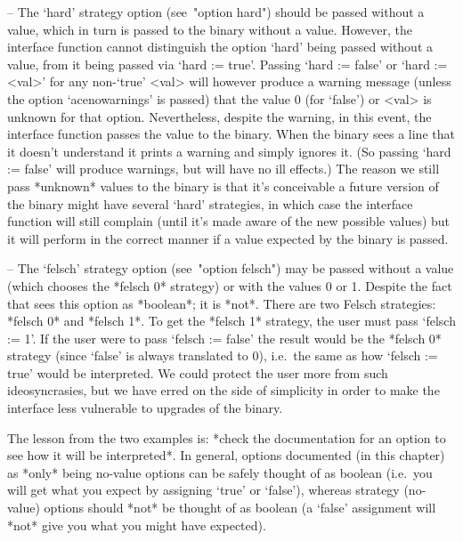 \beginlist

\item{--} The `hard' strategy option  (see~"option  hard")  should  be
passed without a value, which in turn is passed to the  {\ACE}  binary
without  a  value.  However,  the  {\ACE}  interface  function  cannot
distinguish the option `hard' being passed without a  value,  from  it
being passed via `hard := true'. Passing `hard := false' or  `hard  :=
<val>' for any non-`true' <val> will however produce a warning message
(unless the option `acenowarnings' is passed) that the  value  0  (for
`false') or <val> is unknown for that  option.  Nevertheless,  despite
the warning, in this event, the {\ACE} interface function  passes  the
value to the {\ACE} binary. When the {\ACE} binary sees a line that it
doesn't understand it prints a warning  and  simply  ignores  it.  (So
passing `hard := false' will produce warnings, but will  have  no  ill
effects.) The reason we still pass  *unknown*  values  to  the  {\ACE}
binary is that it's conceivable a future version of the {\ACE}  binary
might have  several  `hard'  strategies,  in  which  case  the  {\ACE}
interface function will still complain (until it's made aware  of  the
new possible values) but it will perform in the correct  manner  if  a
value expected by the {\ACE} binary is passed.

\item{--} The `felsch' strategy option (see~"option  felsch")  may  be
passed without a value (which chooses the *felsch 0* strategy) or with
the values 0 or 1. Despite the fact that {\GAP} sees  this  option  as
*boolean*; it is *not*. There are two Felsch  strategies:  *felsch  0*
and *felsch 1*. To get the *felsch 1* strategy,  the  user  must  pass
`felsch := 1'. If the user were to pass `felsch := false'  the  result
would be the *felsch 0* strategy (since `false' is  always  translated
to 0), i.e.~the same as how `felsch := true' would be interpreted.  We
could protect the user more from  such  ideosyncrasies,  but  we  have
erred on the side of simplicity in order to make  the  interface  less
vulnerable to upgrades of the {\ACE} binary.

\endlist

The lesson from the two examples is: *check the documentation  for  an
option to see  how  it  will  be  interpreted*.  In  general,  options
documented (in this chapter) as *only* being no-value options  can  be
safely thought of as boolean (i.e.~you will get  what  you  expect  by
assigning `true' or  `false'),  whereas  strategy  (no-value)  options
should *not* be thought of as boolean (a `false' assignment will *not*
give you what you might have expected).


